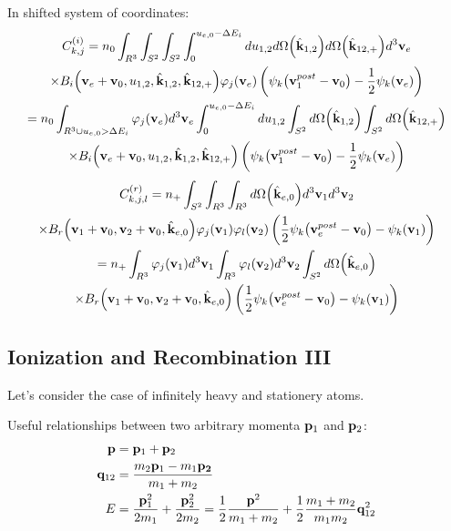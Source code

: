 \documentclass{article}[draft]
\begin{document}
In shifted system of coordinates:
\begin{multline*}
C^{(i)}_{k,j} = 
n_0
\int_{R^3} 
\int_{S^2} \int_{S^2} \int_{0}^{u_{e,0} - \Delta E_i} 
d u_{1,2} d\Omega\of{\hat{\vect{k}}_{1,2}} d\Omega\of{\hat{\vect{k}}_{12,+}} d^3 \vect{v}_e
\\
\times B_i\of{\vect{v}_e + \vect{v}_0, u_{1,2}, \hat{\vect{k}}_{1,2}, \hat{\vect{k}}_{12,+}} \varphi_{j} \of{\vect{v}_e} 
\left( \psi_k\of{\vect{v}_1^{post} - \vect{v}_0}  
- \frac12 \psi_k\of{\vect{v}_e} \right)
\\
= 
n_0
\int_{R^3 \cup u_{e,0} > \Delta E_i} \varphi_{j} \of{\vect{v}_e} d^3 \vect{v}_e
\int_{0}^{u_{e,0} - \Delta E_i} d u_{1,2}
\int_{S^2} d\Omega\of{\hat{\vect{k}}_{1,2}} 
\int_{S^2} d\Omega\of{\hat{\vect{k}}_{12,+}} 
\\
\times B_i\of{\vect{v}_e + \vect{v}_0, u_{1,2}, \hat{\vect{k}}_{1,2}, \hat{\vect{k}}_{12,+}}  
\left( \psi_k\of{\vect{v}_1^{post} - \vect{v}_0}  
- \frac12 \psi_k\of{\vect{v}_e} \right)
\end{multline*}
\begin{multline*}
C^{(r)}_{k,j,l}  =
n_+
\int_{S^2} 
\int_{R^3} \int_{R^3} 
d \Omega\of{\hat{\vect{k}}_{e,0}}
d^3 \vect{v}_1 d^3 \vect{v}_2 
\\
\times B_r\of{\vect{v}_1+\vect{v}_0, \vect{v}_2+\vect{v}_0, \hat{\vect{k}}_{e,0}}
\varphi_{j}\of{\vect{v}_1}  \varphi_{l}\of{\vect{v}_2} 
\left( \frac12 \psi_k\of{\vect{v}_e^{post} - \vect{v}_0}
- \psi_k\of{\vect{v}_1} \right)
\\
=
n_+
\int_{R^3} \varphi_{j}\of{\vect{v}_1} d^3 \vect{v}_1
\int_{R^3} \varphi_{l}\of{\vect{v}_2} d^3 \vect{v}_2 
\int_{S^2}
d \Omega\of{\hat{\vect{k}}_{e,0}}
\\
\times B_r\of{\vect{v}_1+\vect{v}_0, \vect{v}_2+\vect{v}_0, \hat{\vect{k}}_{e,0}}
\left( \frac12 \psi_k\of{\vect{v}_e^{post} - \vect{v}_0}
- \psi_k\of{\vect{v}_1} \right)
\end{multline*}

\newpage
\subsection{Ionization and Recombination III}

Let's consider the case of infinitely heavy and stationery atoms.

Useful relationships between two arbitrary momenta $\mathbf{p}_1$ and $\mathbf{p}_2$:
\begin{align*}
\mathbf{p} &= \mathbf{p}_1 + \mathbf{p}_2 
\\
\mathbf{q}_{12} &= \frac{m_2 \mathbf{p}_1 - m_1 \mathbf{p_2}}{m_1 + m_2}
\\
E &= \frac{\mathbf{p}_1^2}{2 m_1} + \frac{\mathbf{p}_2^2}{2 m_2} 
=
\frac12 \frac{\mathbf{p}^2}{m_1+m_2} + \frac12 \frac{m_1+m_2}{m_1 m_2} \mathbf{q}_{12}^2
\end{align*}
\end{document}
